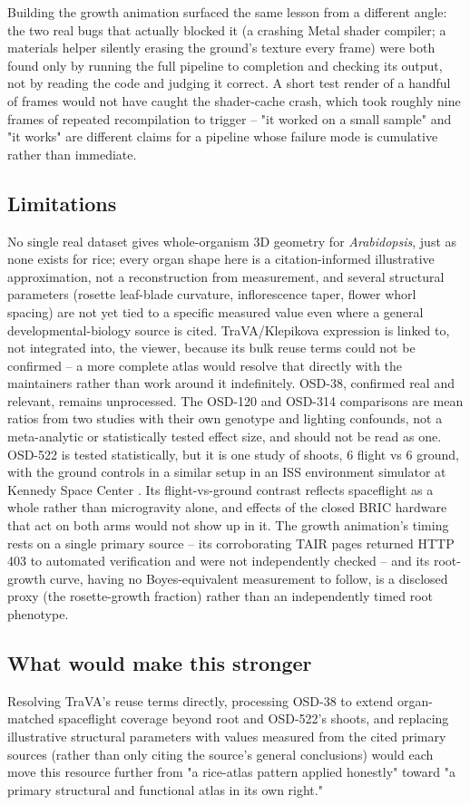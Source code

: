 Building the growth animation surfaced the same lesson from a different angle: the two
real bugs that actually blocked it (a crashing Metal shader compiler; a materials helper
silently erasing the ground's texture every frame) were both found only by running the full
pipeline to completion and checking its output, not by reading the code and judging it
correct. A short test render of a handful of frames would not have caught the shader-cache
crash, which took roughly nine frames of repeated recompilation to trigger -- "it worked on
a small sample" and "it works" are different claims for a pipeline whose failure mode is
cumulative rather than immediate.

\subsection{Limitations}
No single real dataset gives whole-organism 3D geometry for \textit{Arabidopsis}, just as
none exists for rice; every organ shape here is a citation-informed illustrative
approximation, not a reconstruction from measurement, and several structural parameters
(rosette leaf-blade curvature, inflorescence taper, flower whorl spacing) are not yet tied
to a specific measured value even where a general developmental-biology source is cited.
TraVA/Klepikova expression is linked to, not integrated into, the viewer, because its bulk
reuse terms could not be confirmed -- a more complete atlas would resolve that directly
with the maintainers rather than work around it indefinitely. OSD-38, confirmed real and
relevant, remains unprocessed. The OSD-120 and OSD-314 comparisons are mean ratios from two
studies with their own genotype and lighting confounds, not a meta-analytic or statistically
tested effect size, and should not be read as one. OSD-522 is tested statistically, but it is
one study of shoots, 6 flight vs 6 ground, with the ground controls in a similar setup in an
ISS environment simulator at Kennedy Space Center \citep{Olanrewaju2023}. Its
flight-vs-ground contrast reflects spaceflight as a whole rather than microgravity alone, and
effects of the closed BRIC hardware \citep{Olanrewaju2023,Nicholson2021} that act on both arms
would not show up in it. The
growth animation's timing rests on a single primary source \citep{Boyes2001} -- its
corroborating TAIR pages returned HTTP 403 to automated verification and were not
independently checked -- and its root-growth curve, having no Boyes-equivalent measurement
to follow, is a disclosed proxy (the rosette-growth fraction) rather than an independently
timed root phenotype.

\subsection{What would make this stronger}
Resolving TraVA's reuse terms directly, processing OSD-38 to extend organ-matched
spaceflight coverage beyond root and OSD-522's shoots, and replacing illustrative structural
parameters with values measured from the cited primary sources (rather than only citing
the source's general conclusions) would each move this resource further from "a rice-atlas
pattern applied honestly" toward "a primary structural and functional atlas in its own
right."
